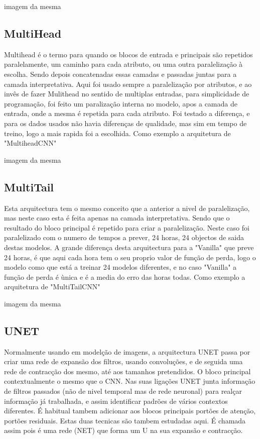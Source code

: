 imagem da mesma

\subsection{MultiHead \label{se:dados_tratamento}}

Multihead é o termo para quando os blocos de entrada e principais são repetidos paralelamente, um caminho para cada atributo, ou uma outra paralelização à escolha. Sendo depois concatenadas essas camadas e passadas juntas para a camada interpretativa.
Aqui foi usado sempre a paralelização por atributos, e ao invês de fazer Mulithead no sentido de multiplas entradas, para simplicidade de programação, foi feito um paralização interna no modelo, apos a camada de entrada, onde a mesma é repetida para cada atributo.
Foi testado a diferença, e para os dados usados não havia diferenças de qualidade, mas sim em tempo de treino, logo a mais rapida foi a escolhida.
Como exemplo a arquitetura de "MultiheadCNN"

imagem da mesma

\subsection{MultiTail \label{se:dados_tratamento}}

Esta arquitectura tem o mesmo conceito que a anterior a nivel de paralelização, mas neste caso esta é feita apenas na camada interpretativa. Sendo que o resultado do bloco principal é repetido para criar a paralelização.
Neste caso foi paralelizado com o numero de tempos a prever, 24 horas, 24 objectos de saida destas modelos. 
A grande diferença desta arquitectura para a "Vanilla" que preve 24 horas, é que aqui cada hora tem o seu proprio valor de função de perda, logo o modelo como que está a treinar 24 modelos diferentes, e no caso "Vanilla" a função de perda é ùnica e é a media do erro das horas todas.
Como exemplo a arquitetura de "MultiTailCNN"

imagem da mesma

\subsection{UNET  \label{se:dados_tratamento}}

Normalmente usando em modelção de imagens, a arquitectura UNET passa por criar uma rede de expansão dos filtros, usando convoluções, e de seguida uma rede de contracção dos mesmo, até aos tamanhos pretendidos.
O bloco principal contextualmente o mesmo que o CNN.
Nas suas ligações UNET junta informação de filtros passados (não de nivel temporal mas de rede neuronal) para realçar informação já trabalhada, e assim identificar padrões de vários contextos diferentes.
É habitual tambem adicionar aos blocos principais portões de atenção, portões residuais. Estas duas tecnicas são tambem estudadas aqui.
É chamada assim pois é uma rede (NET) que forma um U na sua expansão e contracção.


